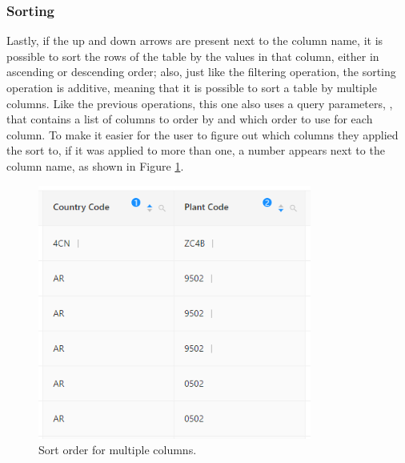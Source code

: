 \subsubsection{Sorting}
Lastly, if the up and down arrows are present next to the column name, it is possible to sort the rows of the table by the values in that column, either in ascending or descending order; also, just like the filtering operation, the sorting operation is additive, meaning that it is possible to sort a table by multiple columns. Like the previous operations, this one also uses a query parameters, , that contains a list of columns to order by and which order to use for each column. To make it easier for the user to figure out which columns they applied the sort to, if it was applied to more than one, a number appears next to the column name, as shown in Figure \ref{fig:sorting}.

\begin{figure}[!htb]
    \centering
    \includegraphics[width=9cm]{chapters/images/ch_3/FE/Common/sorting.png}
    \caption{Sort order for multiple columns.}
    \label{fig:sorting}
\end{figure}


